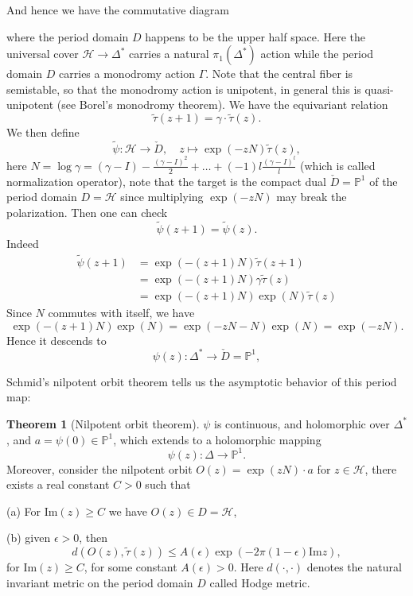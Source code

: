 \documentclass[11pt]{article}
\theoremstyle{definition}
\newtheorem{theorem}{Theorem}
\newcommand\PP{{\mathbb{P}}}
\begin{document}
And hence we have the commutative diagram
\begin{center}
\end{center}
where the period domain $D$ happens to be the upper half space. Here the universal cover $\mathscr{H} \to \Delta^*$ carries a natural $\pi_1(\Delta^*)$ action while the period domain $D$ carries a monodromy action $\Gamma$. Note that the central fiber is semistable, so that the monodromy action is unipotent, in general this is quasi-unipotent (see Borel's monodromy theorem). We have the equivariant relation $$\tilde{\tau}(z+1) = \gamma \cdot \tilde{\tau}(z).$$
We then define $$\widetilde {\psi}:\mathscr{H} \to \check{D}, \quad z \mapsto \exp(- zN) \tilde{\tau}(z),$$here $N = \log \gamma = (\gamma-I)-\frac{(\gamma-I)^2}{2}+\ldots+(-1) l \frac{(\gamma-I)^l}{l}$ (which is called normalization operator), note that the target is the compact dual $\check{D} = \mathbb{P}^1$ of the period domain $D = \mathscr{H}$ since multiplying $\exp(- zN)$ may break the polarization. Then one can check $$\tilde{\psi}(z+1) = \tilde{\psi}(z).$$
Indeed
$$
\begin{aligned}
\widetilde{\psi}(z+1) & =\exp (-(z+1) N) \widetilde{\tau}(z+1) \\
& =\exp (-(z+1) N) \gamma \widetilde{\tau}(z) \\
& =\exp (-(z+1) N) \exp (N) \widetilde{\tau}(z)
\end{aligned}
$$
Since $N$ commutes with itself, we have
$$
\exp (-(z+1) N) \exp (N)=\exp (-z N-N) \exp (N)=\exp (-z N) .
$$
Hence it descends to $$\psi(z): \Delta^* \to \check{D} = \mathbb{P}^1,$$

Schmid's nilpotent orbit theorem tells us the asymptotic behavior of this period map: 

\begin{theorem}[Nilpotent orbit theorem]

$\psi$ is continuous, and holomorphic over $\Delta^*$, and $a = \psi(0) \in \PP^1$, which extends to a holomorphic mapping $$\psi(z): \Delta \to \PP^1.$$Moreover, consider the nilpotent orbit $O(z) = \exp(z N)\cdot a$ for $z\in \mathscr{H}$, there exists a real constant $C>0$ such that

(a) For $\text{Im}(z) \ge C$ we have $O(z) \in D = \mathscr{H}$, 

(b) given $\epsilon >0$, then $$d(O(z),\tilde{\tau}(z))\le A(\epsilon) \exp( - 2\pi (1-\epsilon)\text{Im} z),$$for $\text{Im}(z)\ge C$, for some constant $A(\epsilon)>0$. Here $d(\cdot ,\cdot)$ denotes the natural invariant metric on the period domain $D$ called Hodge metric. 
\end{theorem}
\end{document}
